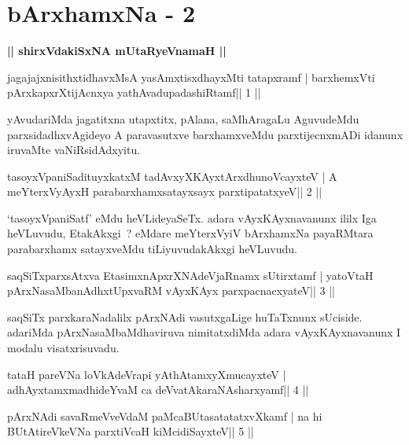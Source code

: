 \chapter{bArxhamxNa - 2}

\begin{center}
{\large{\textbf{|| shirxVdakiSxNA mUtaRyeVnamaH ||}}}
\end{center}

\begin{shl}
jagajajxnisithxtidhavxMsA yasAmxtisxdhayxMti tatapxramf |
barxhemxVti pArxkapxrXtijAcnxya yathAvadupadashiRtamf\hfill || 1 ||
\end{shl}

\begin{artha}
yAvudariMda jagatitxna utapxtitx, pAlana, saMhAragaLu AguvudeMdu
parxsidadhxvAgideyo A paravasutxve barxhamxveMdu parxtijecnxmADi
idanunx iruvaMte vaNiRsidAdxyitu.
\end{artha}

\begin{shl}
tasoyxVpaniSadituyxkatxM tadAvxyXKAyx\s tArxdhunoVcayxteV |
A meYterxVyAyxH parabarxhamxsatayxsayx parxtipatatxyeV\hfill || 2 ||
\end{shl}

\begin{artha}
`tasoyxVpaniSatf' eMdu heVLideyaSeTx. adara vAyxKAyxnavanunx ililx Iga   heVLuvudu, EtakAkxgi~? eMdare meYterxVyiV bArxhamxNa payaRMtara   parabarxhamx satayxveMdu tiLiyuvudakAkxgi heVLuvudu.
\end{artha}




\begin{shl}
saqSiTxparxsAtxva EtasimxnApxrXNAdeVjaRnamx sUtirxtamf |
yatoV\s taH pArxNasaMbanAdhxtUpxvaRM vAyxKAyx parxpacnacxyateV\hfill || 3 ||
\end{shl}

\begin{artha}
saqSiTx parxkaraNadalilx pArxNAdi vasutxgaLige huTaTxnunx sUciside. adariMda pArxNasaMbaMdhaviruva nimitatxdiMda adara vAyxKAyxnavanunx I modalu visatxrisuvadu.
\end{artha}

\begin{shl}
tataH pareVNa loVkAdeVrapi yAthAtamxyXmucayxteV |
adhAyxtamxmadhideYvaM ca deVvatAkaraNAsharxyamf\hfill || 4 ||
\end{shl}

\begin{shl}
pArxNAdi savaRmeVveVdaM paMcaBUtasatatatxvXkamf |
na hi BUtAtireVkeVNa parxtiVcaH kiMcidiSayxteV\hfill || 5 ||
\end{shl}

